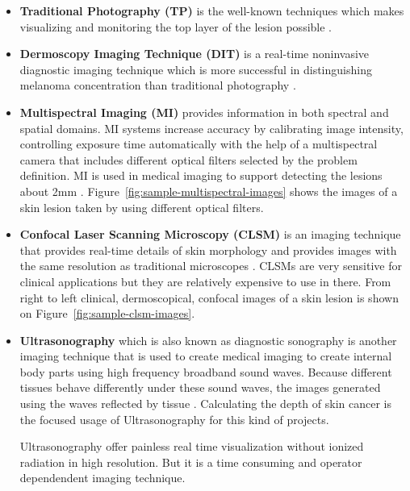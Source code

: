         \begin{itemize}

            \item \textbf{Traditional Photography (TP)} is the well-known techniques which makes visualizing and monitoring the top layer of the lesion possible \cite{feit2004melanomas}.

            \item \textbf{Dermoscopy Imaging Technique (DIT)} is a real-time noninvasive diagnostic imaging technique
                    which is more successful in distinguishing melanoma concentration than traditional photography \cite{aljanabi2019various}.

            \item \textbf{Multispectral Imaging (MI)} provides information in both spectral and spatial domains.
                    MI systems increase accuracy by calibrating image intensity,
                    controlling exposure time automatically with the help of a multispectral camera that includes different optical filters selected by the problem definition.
                    MI is used in medical imaging to support  detecting the lesions about 2mm \cite{aljanabi2019various}.
                    Figure~\ref{fig:sample-multispectral-images} shows the images of a skin lesion taken by using different optical filters.

                    

            \item \textbf{Confocal Laser Scanning Microscopy (CLSM)} is an imaging technique that provides real-time details of skin morphology
                    and provides images with the same resolution as traditional microscopes \cite{gerger2005diagnostic}.
                    CLSMs are very sensitive for clinical applications but they are relatively expensive to use in there.
                    From right to left clinical, dermoscopical, confocal images of a skin lesion is shown on Figure~\ref{fig:sample-clsm-images}.

                    

            \item \textbf{Ultrasonography} which is also known as diagnostic sonography is another imaging technique that is used to create medical imaging to create internal body parts using high frequency broadband sound waves.
                    Because different tissues behave differently under these sound waves,  the images generated using the waves reflected by tissue \cite{sahuquillo2013study}.
                    Calculating the depth of skin cancer is the focused usage of Ultrasonography for this kind of projects.

                    Ultrasonography offer painless real time visualization without ionized radiation in high resolution.
                    But it is a time consuming and operator dependendent imaging technique.

        \end{itemize}
